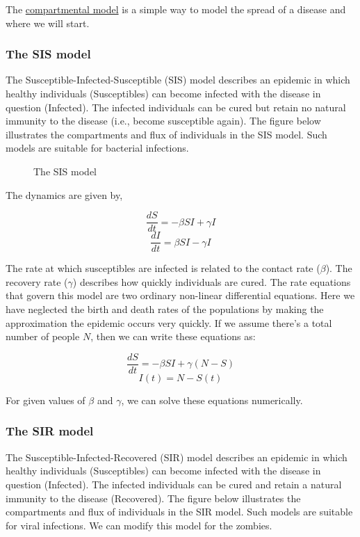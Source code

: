 The
\href{https://en.wikipedia.org/wiki/Compartmental_models_in_epidemiology}{compartmental
model} is a simple way to model the spread of a disease and where we
will start.

\subsubsection{The SIS model}\label{the-sis-model}

The Susceptible-Infected-Susceptible (SIS) model describes an epidemic
in which healthy individuals (Susceptibles) can become infected with the
disease in question (Infected). The infected individuals can be cured
but retain no natural immunity to the disease (i.e., become susceptible
again). The figure below illustrates the compartments and flux of
individuals in the SIS model. Such models are suitable for bacterial
infections.

\begin{figure}
\centering
{}
\caption{The SIS model}
\end{figure}

The dynamics are given by,

\[\dfrac{dS}{dt} = -\beta S I + \gamma I\]
\[\dfrac{dI}{dt} = \beta S I - \gamma I\]

The rate at which susceptibles are infected is related to the contact
rate (\(\beta\)). The recovery rate (\(\gamma\)) describes how quickly
individuals are cured. The rate equations that govern this model are two
ordinary non-linear differential equations. Here we have neglected the
birth and death rates of the populations by making the approximation the
epidemic occurs very quickly. If we assume there's a total number of
people \(N\), then we can write these equations as:

\[\dfrac{dS}{dt} = -\beta S I + \gamma (N - S)\] \[I(t) = N - S(t)\]

For given values of \(\beta\) and \(\gamma\), we can solve these
equations numerically.

\subsubsection{The SIR model}\label{the-sir-model}

The Susceptible-Infected-Recovered (SIR) model describes an epidemic in
which healthy individuals (Susceptibles) can become infected with the
disease in question (Infected). The infected individuals can be cured
and retain a natural immunity to the disease (Recovered). The figure
below illustrates the compartments and flux of individuals in the SIR
model. Such models are suitable for viral infections. We can modify this
model for the zombies.

